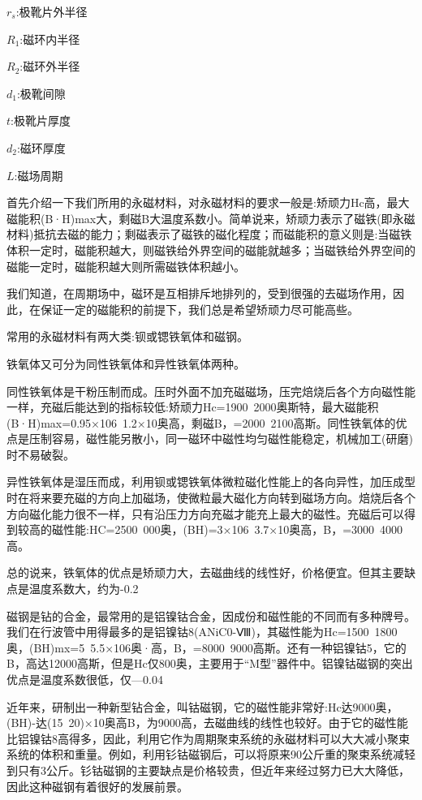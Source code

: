 $ r_s $:极靴片外半径

$ R_1 $:磁环内半径

$ R_2 $:磁环外半径

$ d_1 $:极靴间隙

$ t $:极靴片厚度

$ d_2 $:磁环厚度

$ L $:磁场周期


首先介绍一下我们所用的永磁材料，对永磁材料的要求一般是:矫顽力Hc高，最大磁能积(B·H)max大，剩磁B大温度系数小。简单说来，矫顽力表示了磁铁(即永磁材料)抵抗去磁的能力；剩磁表示了磁铁的磁化程度；而磁能积的意义则是:当磁铁体积一定时，磁能积越大，则磁铁给外界空间的磁能就越多；当磁铁给外界空间的磁能一定时，磁能积越大则所需磁铁体积越小。


我们知道，在周期场中，磁环是互相排斥地排列的，受到很强的去磁场作用，因此，在保证一定的磁能积的前提下，我们总是希望矫顽力尽可能高些。


常用的永磁材料有两大类:钡或锶铁氧体和磁钢。


铁氧体又可分为同性铁氧体和异性铁氧体两种。


同性铁氧体是干粉压制而成。压时外面不加充磁磁场，压完焙烧后各个方向磁性能一样，充磁后能达到的指标较低:矫顽力Hc=1900~2000奥斯特，最大磁能积(B·H)max=0.95×106~1.2×10奥高，剩磁B，=2000~2100高斯。同性铁氧体的优点是压制容易，磁性能另散小，同一磁环中磁性均匀磁性能稳定，机械加工(研磨)时不易破裂。


异性铁氧体是湿压而成，利用钡或锶铁氧体微粒磁化性能上的各向异性，加压成型时在将来要充磁的方向上加磁场，使微粒最大磁化方向转到磁场方向。焙烧后各个方向磁化能力很不一样，只有沿压力方向充磁才能充上最大的磁性。充磁后可以得到较高的磁性能:HC=2500~000奥，(BH)=3×106~3.7×10奥高，B，=3000~4000高。


总的说来，铁氧体的优点是矫顽力大，去磁曲线的线性好，价格便宜。但其主要缺点是温度系数大，约为-0.2%


磁钢是钻的合金，最常用的是铝镍钴合金，因成份和磁性能的不同而有多种牌号。我们在行波管中用得最多的是铝镍钴8(ANiC0-Ⅷ)，其磁性能为Hc=1500~1800奥，(BH)mx=5~5.5×106奥·高，B，=8000~9000高斯。还有一种铝镍钴5，它的B，高达12000高斯，但是Hc仅800奥，主要用于“M型”器件中。铝镍钴磁钢的突出优点是温度系数很低，仅—0.04%


近年来，研制出一种新型钻合金，叫钴磁钢，它的磁性能非常好:Hc达9000奥，(BH)-达(15~20)×10奥高B，为9000高，去磁曲线的线性也较好。由于它的磁性能比铝镍钴8高得多，因此，利用它作为周期聚束系统的永磁材料可以大大减小聚束系统的体积和重量。例如，利用钐钴磁钢后，可以将原来90公斤重的聚束系统减轻到只有3公斤。钐钴磁钢的主要缺点是价格较贵，但近年来经过努力已大大降低，因此这种磁钢有着很好的发展前景。


